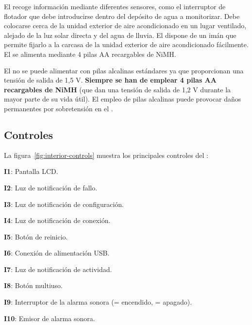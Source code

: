 El \MEE recoge información mediante diferentes sensores, como el interruptor de flotador que debe introducirse dentro del depósito de agua a monitorizar.
Debe colocarse cerca de la unidad exterior de aire acondicionado en un lugar ventilado, alejado de la luz solar directa y del agua de lluvia.
El \ME dispone de un imán que permite fijarlo a la carcasa de la unidad exterior de aire acondicionado fácilmente.
El \MEE se alimenta mediante 4 pilas AA recargables de NiMH.

El \MEE no se puede alimentar con pilas alcalinas estándares ya que proporcionan una tensión de salida de 1,5 V. \textbf{Siempre se han de emplear 4 pilas AA recargables de NiMH} (que dan una tensión de salida de 1,2 V durante la mayor parte de su vida útil). El empleo de pilas alcalinas puede provocar daños permanentes por sobretensión en el \ME. 
\importantend

\endgroup

\subsection{Controles}
\label{sect:controles}

La figura~\ref{fig:interior-controls} muestra los principales controles del \MI:


\begin{enumeratecompact}
  \item[\textbf{\color{main}I1}:] Pantalla LCD.
  \item[\textbf{\color{main}I2}:] Luz de notificación de fallo.
  \item[\textbf{\color{main}I3}:] Luz de notificación de configuración.
  \item[\textbf{\color{main}I4}:] Luz de notificación de conexión.
  \item[\textbf{\color{main}I5}:] Botón de reinicio.
  \item[\textbf{\color{main}I6}:] Conexión de alimentación USB.
  \item[\textbf{\color{main}I7}:] Luz de notificación de actividad.
  \item[\textbf{\color{main}I8}:] Botón multiuso.
  \item[\textbf{\color{main}I9}:] Interruptor de la alarma sonora (\on = encendido, \off = apagado).
  \item[\textbf{\color{main}I10}:] Emisor de alarma sonora.
\end{enumeratecompact}

